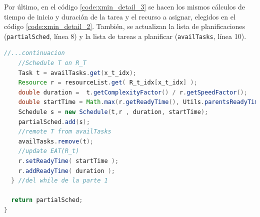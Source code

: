 Por último, en el código \ref{code:xmin_detail_3} se hacen los mismos cálculos de tiempo de inicio y duración de la tarea y el recurso a asignar, elegidos en el código \ref{code:xmin_detail_2}. También, se actualizan la lista de planificaciones (\texttt{partialSched}, línea 8) y la lista de tareas a planificar (\texttt{availTasks}, línea 10).

\begin{lstlisting}[language=java,label={code:xmin_detail_3},caption={Método de MaxMin/MinMin que planifica las tareas (parte 3)},float]
    //...continuacion
    //Schedule T on R_T
    Task t = availTasks.get(x_t_idx);
    Resource r = resourceList.get( R_t_idx[x_t_idx] );
    double duration =  t.getComplexityFactor() / r.getSpeedFactor();
    double startTime = Math.max(r.getReadyTime(), Utils.parentsReadyTime(t, partialSched, w));
    Schedule s = new Schedule(t,r , duration, startTime);
    partialSched.add(s);
    //remote T from availTasks
    availTasks.remove(t);
    //update EAT(R_t)
    r.setReadyTime( startTime );
    r.addReadyTime( duration );
  } //del while de la parte 1

  return partialSched;
}
\end{lstlisting}
